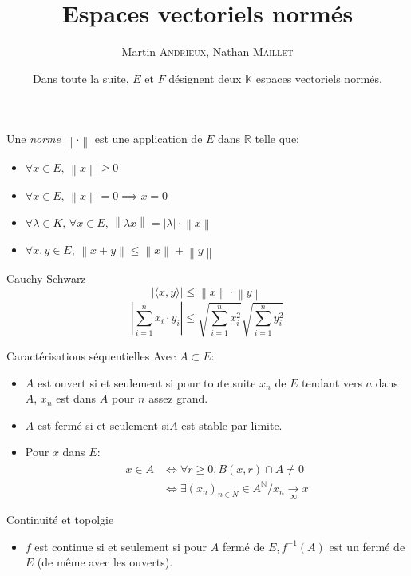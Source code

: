 \documentclass[french, a4paper, 11pt, twocolumn]{article}
\title{Espaces vectoriels normés}
\author{Martin \textsc{Andrieux}, Nathan \textsc{Maillet}}
\date{Dans toute la suite, $E$ et $F$ désignent deux $\mathbb{K}$ espaces vectoriels normés.}
\newcommand{\ssi}{si et seulement si\xspace}		%
\newcommand{\norme}[1]{\left\| #1\right\|}
\newcommand{\abs}[1]{\left\lvert #1\right\rvert}
\newcommand{\limit}[1]{\underset{#1}{\rightarrow}}  %
\newcommand{\N}{\mathbb{N}}   %
\newcommand{\R}{\mathbb{R}}   %
\begin{document}
\maketitle

\begin{definition}
  Une \emph{norme} $\norme{\cdot}$ est une application de $E$ dans $\R$ telle que:
  \begin{itemize}[label=$\bullet$]
    \item $\forall x\in E,\,\norme{x}\geqslant 0$
    \item $\forall x\in E,\,\norme{x}=0\implies x=0$
    \item $\forall\lambda\in K,\,\forall x\in E,\, \norme{\lambda x}=\abs{\lambda} \cdot \norme{x}$
    \item $\forall x,y\in E,\, \norme{x+y}\leqslant\norme{x}+\norme{y}$
  \end{itemize}
\end{definition}

\begin{theoreme}{Cauchy Schwarz}
  \[\left\lvert \langle x,y\rangle\right\rvert\leqslant\norme{x}\cdot\norme{y}\]
  \tcblower
  \[\abs{\sum_{i=1}^n x_{i}\cdot y_{i}}\leqslant \sqrt{\sum_{i=1}^n x_{i}^{2}}\sqrt{\sum_{i=1}^n y_{i}^{2}}\]
\end{theoreme}

\begin{theoreme}{Caractérisations séquentielles}
    Avec $A \subset E$:
    \begin{itemize}[label=$\bullet$]
        \item $A$ est ouvert \ssi pour toute suite $x_{n}$ de $E$ tendant vers $a$ dans $A$, $x_{n}$ est dans $A$ pour $n$ assez grand.
        \item $A$ est fermé \ssi $A$ est stable par limite.
        \item Pour $x$ dans $E$:
        \begin{align*} 
            x \in \bar{A} & \iff \forall r \geq 0, B(x,r) \cap A \neq 0 \\
                          & \iff \exists {(x_n)}_{n\in N} \in A^{\N} / x_n \limit{\infty} x
        \end{align*}
    \end{itemize}
\end{theoreme}

\begin{theoreme}{Continuité et topolgie}
    \begin{itemize}[label=$\bullet$]
        \item $f$ est continue \ssi pour $A$ fermé de $E$,$\, f^{-1}(A)$ est un fermé de $E$ (de même avec les ouverts).
    \end{itemize}
\end{theoreme}
\end{document}
